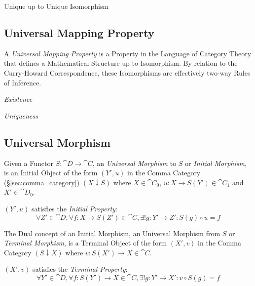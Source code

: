 Unique up to Unique Isomorphism



\subsection{Universal Mapping Property}
\label{sec:universal_mapping_property}

A \emph{Universal Mapping Property} is a Property in the Language of
Category Theory that defines a Mathematical Structure up to
Isomorphism. By relation to the Curry-Howard Correspondence, these
Isomorphisms are effectively two-way Rules of Inference.

\emph{Existence}

\emph{Uniqueness}



\subsection{Universal Morphism}\label{sec:universal_morphism}

Given a Functor $S: \cat{D} \rightarrow \cat{C}$, an
\emph{Universal Morphism} to $S$ or \emph{Initial Morphism}, is an
Initial Object of the form $(Y',u)$ in the Comma Category
(\S\ref{sec:comma_category}) $(X \downarrow S)$ where $X \in
\cat{C}_0$, $u : X \rightarrow S(Y') \in \cat{C}_1$ and $X' \in
\cat{D}_0$.

$(Y', u)$ satisfies the \emph{Initial Property}:
\[
  \forall Z' \in \cat{D}, \forall f : X \rightarrow S(Z') \in
  \cat{C}, \exists! g : Y' \rightarrow Z' : S(g) \circ u = f
\]

The Dual concept of an Initial Morphism, an Universal Morphism from
$S$ or \emph{Terminal Morphism}, is a Terminal Object of the form
$(X',v)$ in the Comma Category $(S \downarrow X)$ where $v : S(X')
\rightarrow X \in \cat{C}$.

$(X',v)$ satisfies the \emph{Terminal Property}:
\[
  \forall Y' \in \cat{D}, \forall f : S(Y') \rightarrow X \in
  \cat{C}, \exists! g : Y' \rightarrow X' : v \circ S(g) = f
\]




